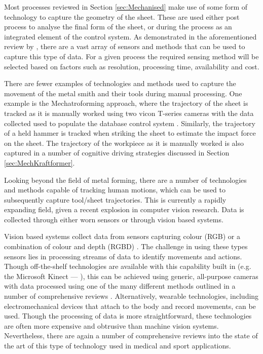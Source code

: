 Most processes reviewed in Section \ref{sec:Mechanised} make use of some form of technology to capture the geometry of the sheet. These are used either post process to analyse the final form of the sheet, or during the process as an integrated element of the control system. As demonstrated in the aforementioned review by \cite{Allwood2016Closed-loopForming}, there are a vast array of sensors and methods that can be used to capture this type of data. For a given process the required sensing method will be selected based on factors such as resolution, processing time, availability and cost. 

There are fewer examples of technologies and methods used to capture the movement of the metal smith and their tools during manual processing. One example is the Mechatroforming approach, where the trajectory of the sheet is tracked as it is manually worked using two vicon T-series cameras with the data collected used to populate the database control system \citep{Ilangovan2016AnForming}. Similarly, the trajectory of a held hammer is tracked when striking the sheet to estimate the impact force on the sheet. The trajectory of the workpiece as it is manually worked is also captured in a number of cognitive driving strategies discussed in Section \ref{sec:MechKraftformer}. 

Looking beyond the field of metal forming, there are a number of technologies and methods capable of tracking human motions, which can be used to subsequently capture tool/sheet trajectories. This is currently a rapidly expanding field, given a recent explosion in computer vision research. Data is collected through either worn sensors or through vision based systems.

Vision based systems collect data from sensors capturing colour (RGB) or a combination of colour and depth (RGBD) \citep{Zhang2019AMethods}. The challenge in using these types sensors lies in processing streams of data to identify movements and actions. Though off-the-shelf technologies are available with this capability built in (e.g. the Microsoft Kinect --- \cite{Shotton2011Real-timeImages}), this can be achieved using generic, all-purpose cameras with data processed using one of the many different methods outlined in a number of comprehensive reviews \citep{Zhang2019AMethods,Beddiar2020Vision-basedSurvey}. Alternatively, wearable technologies, including electromechanical devices that attach to the body and record movements, can be used. Though the processing of data is more straightforward, these technologies are often more expensive and obtrusive than machine vision systems. Nevertheless, there are again a number of comprehensive reviews into the state of the art of this type of technology used in medical \citep{Homayounfar2020WearableChallenges} and sport \citep{Taborri2020SportOverview} applications.

